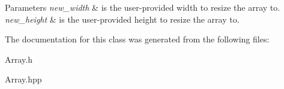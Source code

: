 \begin{DoxyParams}{Parameters}
{\em new\+\_\+width} & is the user-\/provided width to resize the array to. \\
\hline
{\em new\+\_\+height} & is the user-\/provided height to resize the array to. \\
\hline
\end{DoxyParams}


The documentation for this class was generated from the following files\+:\begin{DoxyCompactItemize}
\item 
Array.\+h\item 
Array.\+hpp\end{DoxyCompactItemize}
